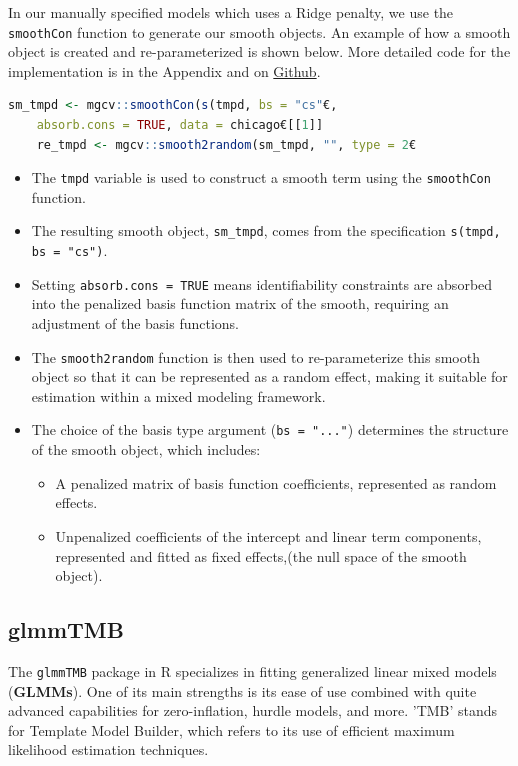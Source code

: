 \documentclass[12pt, twoside,hidelinks]{article}
\theoremstyle{definition}
\numberwithin{equation}{section}
\begin{document}
In our manually specified models which uses a Ridge penalty, we use the \texttt{smoothCon} function to generate our smooth objects. An example of how a smooth object is created and re-parameterized is shown below. More detailed code for the implementation is in the Appendix and on \href{https://github.com/AllInCade/MasterProject/tree/main}{Github}. 

\begin{lstlisting}[language=R]
    sm_tmpd <- mgcv::smoothCon(s(tmpd, bs = "cs"€,
    absorb.cons = TRUE, data = chicago€[[1]]
    re_tmpd <- mgcv::smooth2random(sm_tmpd, "", type = 2€
\end{lstlisting}

\begin{itemize}
    \item The \texttt{tmpd} variable is used to construct a smooth term using the \texttt{smoothCon} function.
    \item The resulting smooth object, \texttt{sm\_tmpd}, comes from the specification \texttt{s(tmpd, bs = "cs")}.
    \item Setting \texttt{absorb.cons = TRUE} means identifiability constraints are absorbed into the penalized basis function matrix of the smooth, requiring an adjustment of the basis functions.
    \item The \texttt{smooth2random} function is then used to re-parameterize this smooth object so that it can be represented as a random effect, making it suitable for estimation within a mixed modeling framework.
    \item The choice of the basis type argument (\texttt{bs = "..."}) determines the structure of the smooth object, which includes:
    \begin{itemize}
        \item A penalized matrix of basis function coefficients, represented as random effects.
        \item Unpenalized coefficients of the intercept and linear term components, represented and fitted as fixed effects,(the null space of the smooth object).
    \end{itemize}
\end{itemize}


\subsection{glmmTMB}\label{sec:rpack:glmmTMB}

The \texttt{glmmTMB} \citep{GlmmTMB2017} package in R specializes in fitting generalized linear mixed models (\textbf{GLMMs}). One of its main strengths is its ease of use combined with quite advanced capabilities for zero-inflation, hurdle models, and more. 'TMB' stands for Template Model Builder, which refers to its use of efficient maximum likelihood estimation techniques.
\end{document}
